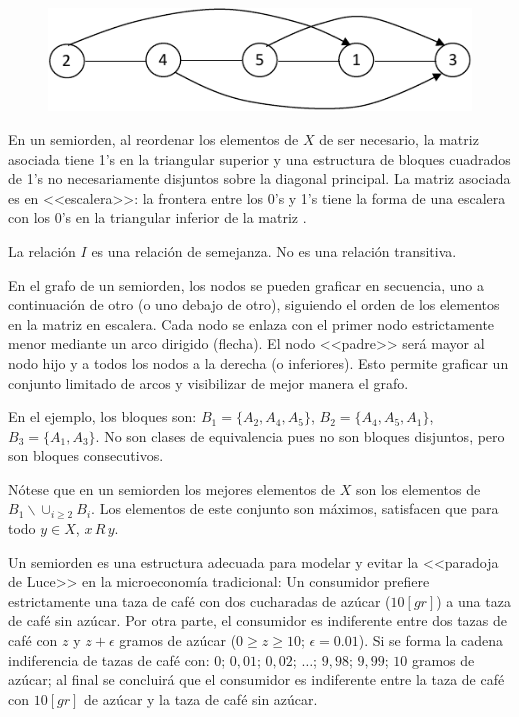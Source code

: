 \documentclass[a5paper,doc,10pt,noapacite]{apa6}
\begin{document}
{{\vspace{-1\baselineskip}
\begin{figure}[H]
    \centering
    \includegraphics[scale=0.9]{Graficos/fig4_RB}
    \label{fig:RB_grafo4}
\end{figure}

En un semiorden, al reordenar los elementos de \(X\) de ser necesario, la matriz asociada tiene 1’s en la triangular superior y una estructura de bloques cuadrados de 1’s no necesariamente disjuntos sobre la diagonal principal. La matriz asociada es en <<escalera>>: la frontera entre los 0’s y 1’s tiene la forma de una escalera con los 0’s en la triangular inferior de la matriz \cite{Monjardet-1978}.

La relación \(I\) es una relación de semejanza. No es una relación transitiva.

En el grafo de un semiorden, los nodos se pueden graficar en secuencia, uno a continuación de otro (o uno debajo de otro), siguiendo el orden de los elementos en la matriz en escalera. Cada nodo se enlaza con el primer nodo estrictamente menor mediante un arco dirigido (flecha). El nodo <<padre>> será mayor al nodo hijo y a todos los nodos a la derecha (o inferiores). Esto permite graficar un conjunto limitado de arcos y visibilizar de mejor manera el grafo.

En el ejemplo, los bloques son: \(B_1 = \{A_2, A_4, A_5\}\), \(B_2 = \{A_4, A_5, A_1\}\), \(B_3 = \{A_1, A_3\}\). No son clases de equivalencia pues no son bloques disjuntos, pero son bloques consecutivos.

Nótese que en un semiorden los mejores elementos de \(X\) son los elementos de \(B_1 \backslash \cup _{i \geq 2} B_i\). Los elementos de este conjunto son máximos, satisfacen que para todo \(y \in X\), \(x \, R \, y\).

\vspace{1\baselineskip}
Un semiorden es una estructura adecuada para modelar y evitar la <<paradoja de Luce>> en la microeconomía tradicional: Un consumidor prefiere estrictamente una taza de café con dos cucharadas de azúcar (\(10 [gr]\)) a una taza de café sin azúcar. Por otra parte, el consumidor es indiferente entre dos tazas de café con \(z\) y \(z + \epsilon\) gramos de azúcar (\(0 \geq z \geq 10\); \(\epsilon = 0.01\)). Si se forma la cadena indiferencia de tazas de café con: \(0\); \(0,01\); \(0,02\); \(\dots\); \(9,98\); \(9,99\); \(10\) gramos de azúcar; al final se concluirá que el consumidor es indiferente entre la taza de café con \(10 [gr]\) de azúcar y la taza de café sin azúcar.

}}
\end{document}
